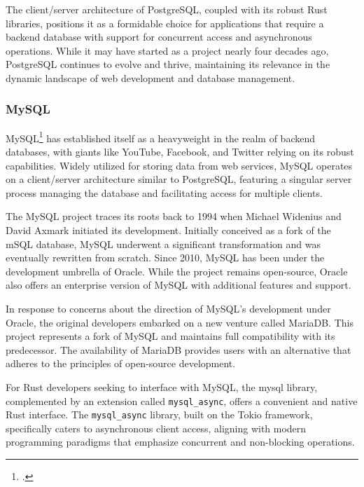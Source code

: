 The client/server architecture of PostgreSQL, coupled with its robust Rust libraries, positions it as a formidable choice for applications that require a 
backend database with support for concurrent access and asynchronous operations. While it may have started as a project nearly four decades ago, PostgreSQL 
continues to evolve and thrive, maintaining its relevance in the dynamic landscape of web development and database management.

\subsubsection{MySQL}
MySQL\footcite{mysql} has established itself as a heavyweight in the realm of backend databases, with giants like YouTube, Facebook, and Twitter relying on its 
robust capabilities. Widely utilized for storing data from web services, MySQL operates on a client/server architecture similar to PostgreSQL, featuring a 
singular server process managing the database and facilitating access for multiple clients.\newline

The MySQL project traces its roots back to 1994 when Michael Widenius and David Axmark initiated its development. Initially conceived as a fork of the mSQL 
database, MySQL underwent a significant transformation and was eventually rewritten from scratch. Since 2010, MySQL has been under the development umbrella of 
Oracle. While the project remains open-source, Oracle also offers an enterprise version of MySQL with additional features and support.\newline

In response to concerns about the direction of MySQL's development under Oracle, the original developers embarked on a new venture called MariaDB. This project 
represents a fork of MySQL and maintains full compatibility with its predecessor. The availability of MariaDB provides users with an alternative that adheres 
to the principles of open-source development.\newline

For Rust developers seeking to interface with MySQL, the mysql library, complemented by an extension called \verb+mysql_async+, offers a convenient and native 
Rust interface. The \verb+mysql_async+ library, built on the Tokio framework, specifically caters to asynchronous client access, aligning with modern 
programming paradigms that emphasize concurrent and non-blocking operations.\newline

